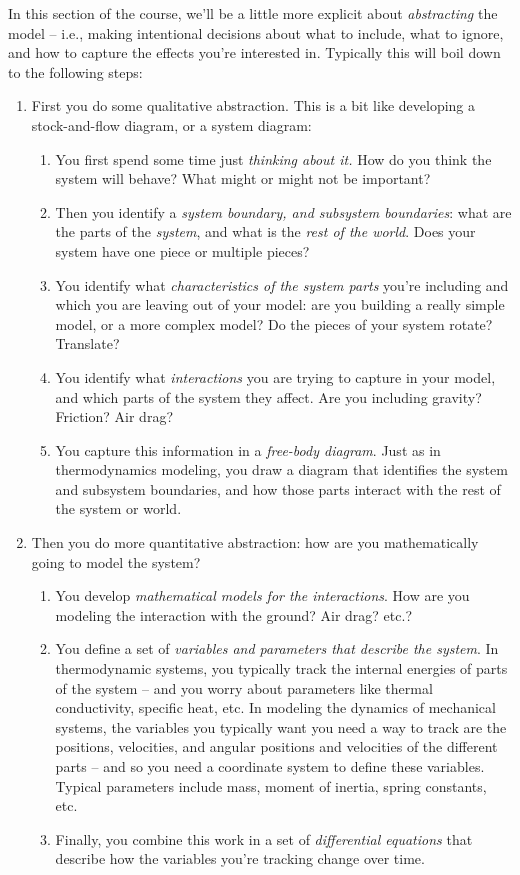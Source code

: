 In this section of the course, we'll be a little more explicit about {\it abstracting} the model -- i.e., making intentional decisions about what to include, what to ignore,  and how to capture the effects you're interested in.  Typically this will boil down to the following steps:
\begin{enumerate}
\item First you do some qualitative abstraction.  This is a bit like developing a stock-and-flow diagram, or a system diagram:
\begin{enumerate}
\item You first spend some time just {\it thinking about it.}  How do you think the system will behave?  What might or might not be important?
\item Then you identify a {\it system boundary, and subsystem boundaries}:  what are the parts of the {\it system}, and what is the {\it rest of the world}.  Does your system have one piece or multiple pieces?  
\item You identify what {\it characteristics of the system parts} you're including and which you are leaving out of your model: are you building a really simple model, or a more complex model?  Do the pieces of your system rotate?  Translate?    
\item You identify what {\it interactions} you are trying to capture in your model, and which parts of the system they affect.  Are you including gravity?  Friction?  Air drag?
\item You capture this information in a {\it free-body diagram}.  Just as in thermodynamics modeling, you draw a diagram that identifies the system and subsystem boundaries, and how those parts interact with the rest of the system or world. 
\end{enumerate}
\item Then you do more quantitative abstraction:  how are you mathematically going to model the system?
\begin{enumerate}
 \item You develop {\it mathematical models for the interactions}.  How are you modeling the interaction with the ground?  Air drag?  etc.?
\item You define a set of {\it variables and parameters that describe the system}.  In thermodynamic systems, you typically track the internal energies of parts of the system -- and you worry about parameters like thermal conductivity, specific heat, etc.  In modeling the dynamics of mechanical systems, the variables you typically want you need a way to track are the positions, velocities, and angular positions and velocities of the different parts  -- and so you need a coordinate system to define these variables. Typical parameters include mass, moment of inertia, spring constants, etc. 
\item Finally, you combine this work in a set of {\it differential equations} that describe how the variables you're tracking change over time.
\end{enumerate}
\end{enumerate}


